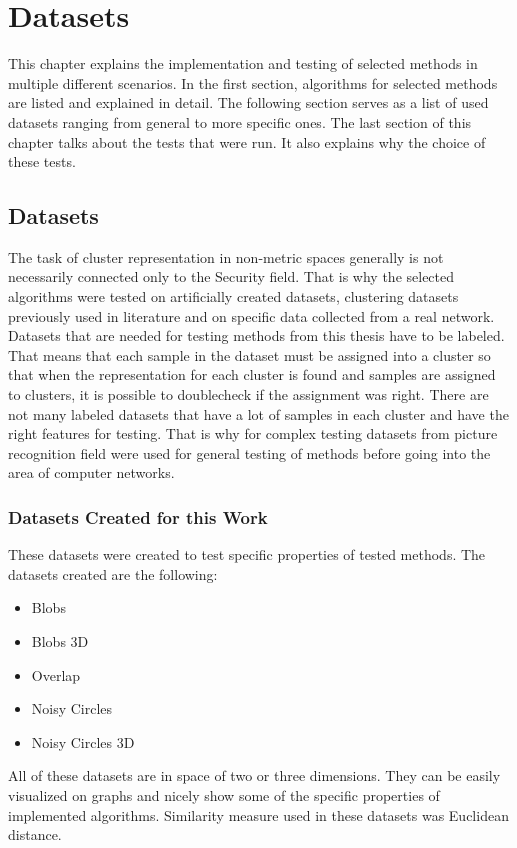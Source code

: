 \documentclass[thesis=B,english]{FITthesis}[2012/10/20]
\begin{document}

\chapter{Datasets}\label{ch:performance}

This chapter explains the implementation and testing of selected methods in multiple different scenarios.
In the first section, algorithms for selected methods are listed and explained in detail.
The following section serves as a list of used datasets ranging from general to more specific ones.
The last section of this chapter talks about the tests that were run.
It also explains why the choice of these tests.

\section{Datasets}\label{sec:datasets}
The task of cluster representation in non-metric spaces generally is not necessarily connected only to the Security field.
That is why the selected algorithms were tested on artificially created datasets, clustering datasets previously used in literature and on specific data collected from a real network.
Datasets that are needed for testing methods from this thesis have to be labeled.
That means that each sample in the dataset must be assigned into a cluster so that when the representation for each cluster is found and samples are assigned to clusters, it is possible to doublecheck if the assignment was right.
There are not many labeled datasets that have a lot of samples in each cluster and have the right features for testing. 
That is why for complex testing datasets from picture recognition field were used for general testing of methods before going into the area of computer networks.

\subsection{Datasets Created for this Work}

These datasets were created to test specific properties of tested methods.
The datasets created are the following:
\begin{itemize}
    \item Blobs
    \item Blobs 3D
    \item Overlap
    \item Noisy Circles
    \item Noisy Circles 3D 
\end{itemize}
All of these datasets are in space of two or three dimensions.
They can be easily visualized on graphs and nicely show some of the specific properties of implemented algorithms.
Similarity measure used in these datasets was Euclidean distance. \\
\end{document}
